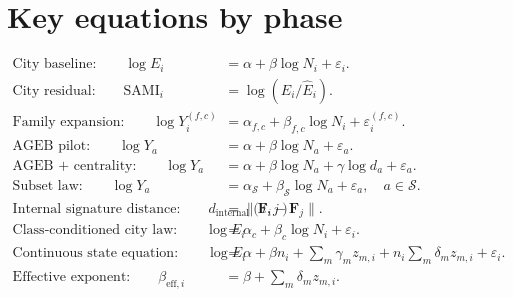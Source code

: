 \documentclass[11pt]{article}
\newcommand{\SAMI}{\operatorname{SAMI}}
\begin{document}
\section{Key equations by phase}

\begin{align}
\text{City baseline:}\qquad
\log E_i &= \alpha + \beta \log N_i + \varepsilon_i.\\
\text{City residual:}\qquad
\SAMI_i &= \log(E_i/\widehat{E}_i).\\
\text{Family expansion:}\qquad
\log Y_i^{(f,c)} &= \alpha_{f,c} + \beta_{f,c}\log N_i + \varepsilon_i^{(f,c)}.\\
\text{AGEB pilot:}\qquad
\log Y_a &= \alpha + \beta \log N_a + \varepsilon_a.\\
\text{AGEB + centrality:}\qquad
\log Y_a &= \alpha + \beta \log N_a + \gamma \log d_a + \varepsilon_a.\\
\text{Subset law:}\qquad
\log Y_a &= \alpha_{\mathcal{S}} + \beta_{\mathcal{S}}\log N_a + \varepsilon_a,\quad a\in\mathcal{S}.\\
\text{Internal signature distance:}\qquad
d_{\mathrm{internal}}(i,j) &= \|\mathbf{F}_i-\mathbf{F}_j\|.\\
\text{Class-conditioned city law:}\qquad
\log E_i &= \alpha_c + \beta_c \log N_i + \varepsilon_i.\\
\text{Continuous state equation:}\qquad
\log E_i &= \alpha + \beta n_i + \sum_m \gamma_m z_{m,i} + n_i\sum_m \delta_m z_{m,i} + \varepsilon_i.\\
\text{Effective exponent:}\qquad
\beta_{\mathrm{eff},i} &= \beta + \sum_m \delta_m z_{m,i}.
\end{align}
\end{document}
